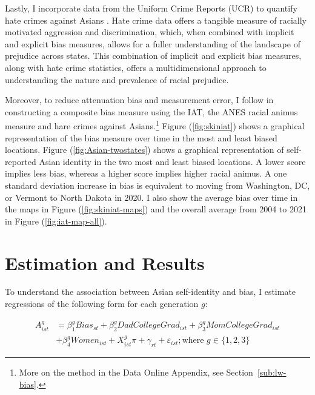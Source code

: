 Lastly, I incorporate data from the Uniform Crime Reports (UCR) to quantify hate crimes against Asians \autocite{ucrbook}. Hate crime data offers a tangible measure of racially motivated aggression and discrimination, which, when combined with implicit and explicit bias measures, allows for a fuller understanding of the landscape of prejudice across states. This combination of implicit and explicit bias measures, along with hate crime statistics, offers a multidimensional approach to understanding the nature and prevalence of racial prejudice.

Moreover, to reduce attenuation bias and measurement error, I follow \textcite{lubotskyInterpretationRegressionsMultiple2006} in constructing a composite bias measure using  the IAT, the ANES racial animus measure and hare crimes against Asians.\footnote{More on the method in the Data Online Appendix, see Section~\ref{sub:lw-bias}.} Figure (\ref{fig:skiniat}) shows a graphical representation of the bias measure over time in the most and least biased locations. Figure (\ref{fig:Asian-twostates}) shows a graphical representation of self-reported Asian identity in the two most and least biased locations. A lower score implies less bias, whereas a higher score implies higher racial animus. A one standard deviation increase in bias is equivalent to moving from Washington, DC, or Vermont to North Dakota in 2020. I also show the average bias over time in the maps in Figure (\ref{fig:skiniat-maps}) and the overall average from 2004 to 2021 in Figure (\ref{fig:iat-map-all}).
\section{Estimation and Results}\label{sec:empstrat}

To understand the association between Asian self-identity and bias, I estimate regressions of the following form for each generation $g$:
 
\begin{align}
A_{ist}^g &= \beta_1^g Bias_{st} + \beta_2^g DadCollegeGrad_{ist} + \beta_3^g MomCollegeGrad_{ist} \nonumber \\ 
            &+ \beta_4^g Women_{ist} + X_{ist}^g\pi + \gamma_{rt} 
           + \varepsilon_{ist}; 
           \text{where } g \in \{1,2,3\} \label{eq:identity_reg_bias}
\end{align}

